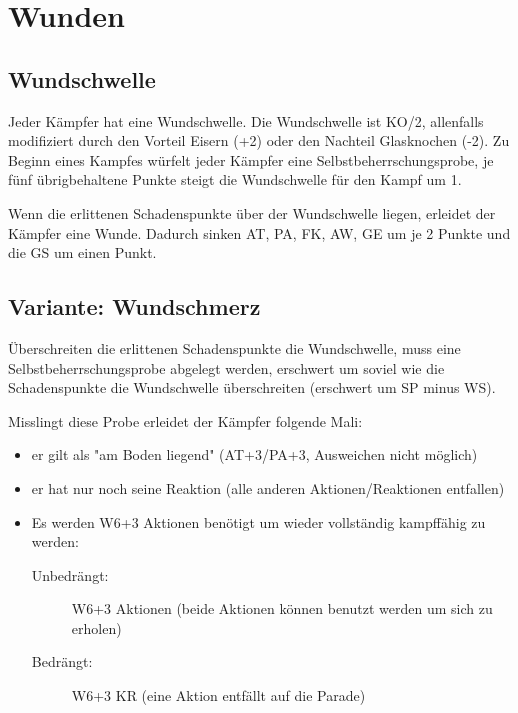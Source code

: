 %

\chapter{Wunden}
\section{Wundschwelle}
Jeder Kämpfer hat eine Wundschwelle.
Die Wundschwelle ist KO/2, allenfalls modifiziert durch den Vorteil Eisern (+2) oder den Nachteil Glasknochen (-2).
Zu Beginn eines Kampfes würfelt jeder Kämpfer eine Selbstbeherrschungsprobe, je fünf übrigbehaltene Punkte steigt die Wundschwelle für den Kampf um 1.

Wenn die erlittenen Schadenspunkte über der Wundschwelle liegen, erleidet der Kämpfer eine Wunde.
Dadurch sinken AT, PA, FK, AW, GE um je 2 Punkte und die GS um einen Punkt.

\section{Variante: Wundschmerz}
Überschreiten die erlittenen Schadenspunkte die Wundschwelle, muss eine Selbstbeherrschungsprobe abgelegt werden, erschwert um soviel wie die Schadenspunkte die Wundschwelle überschreiten (erschwert um SP minus WS).

Misslingt diese Probe erleidet der Kämpfer folgende Mali:

\begin{itemize}
    \item er gilt als "am Boden liegend" (AT+3/PA+3, Ausweichen nicht möglich)
    \item er hat nur noch seine Reaktion (alle anderen Aktionen/Reaktionen entfallen)
    \item Es werden W6+3 Aktionen benötigt um wieder vollständig kampffähig zu werden:
    \begin{description}
        \item[Unbedrängt:] W6+3 Aktionen (beide Aktionen können benutzt werden um sich zu erholen)
        \item[Bedrängt:] W6+3 KR (eine Aktion entfällt auf die Parade)
    \end{description}
\end{itemize}

